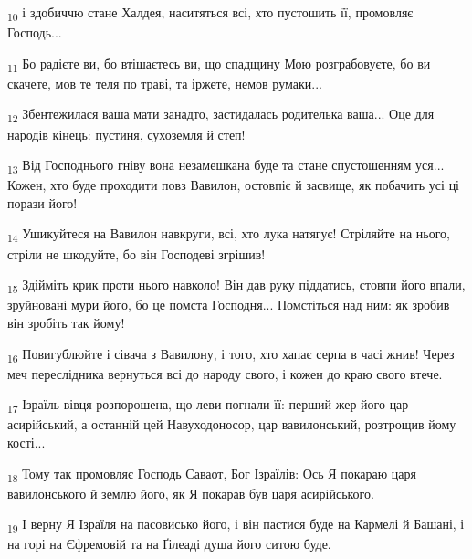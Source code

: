 \begin{tcolorbox}
\textsubscript{10} і здобиччю стане Халдея, наситяться всі, хто пустошить її, промовляє Господь...
\end{tcolorbox}
\begin{tcolorbox}
\textsubscript{11} Бо радієте ви, бо втішаєтесь ви, що спадщину Мою розграбовуєте, бо ви скачете, мов те теля по траві, та іржете, немов румаки...
\end{tcolorbox}
\begin{tcolorbox}
\textsubscript{12} Збентежилася ваша мати занадто, застидалась родителька ваша... Оце для народів кінець: пустиня, сухоземля й степ!
\end{tcolorbox}
\begin{tcolorbox}
\textsubscript{13} Від Господнього гніву вона незамешкана буде та стане спустошенням уся... Кожен, хто буде проходити повз Вавилон, остовпіє й засвище, як побачить усі ці порази його!
\end{tcolorbox}
\begin{tcolorbox}
\textsubscript{14} Ушикуйтеся на Вавилон навкруги, всі, хто лука натягує! Стріляйте на нього, стріли не шкодуйте, бо він Господеві згрішив!
\end{tcolorbox}
\begin{tcolorbox}
\textsubscript{15} Здійміть крик проти нього навколо! Він дав руку піддатись, стовпи його впали, зруйновані мури його, бо це помста Господня... Помстіться над ним: як зробив він зробіть так йому!
\end{tcolorbox}
\begin{tcolorbox}
\textsubscript{16} Повигублюйте і сівача з Вавилону, і того, хто хапає серпа в часі жнив! Через меч переслідника вернуться всі до народу свого, і кожен до краю свого втече.
\end{tcolorbox}
\begin{tcolorbox}
\textsubscript{17} Ізраїль вівця розпорошена, що леви погнали її: перший жер його цар асирійський, а останній цей Навуходоносор, цар вавилонський, розтрощив йому кості...
\end{tcolorbox}
\begin{tcolorbox}
\textsubscript{18} Тому так промовляє Господь Саваот, Бог Ізраїлів: Ось Я покараю царя вавилонського й землю його, як Я покарав був царя асирійського.
\end{tcolorbox}
\begin{tcolorbox}
\textsubscript{19} І верну Я Ізраїля на пасовисько його, і він пастися буде на Кармелі й Башані, і на горі на Єфремовій та на Ґілеаді душа його ситою буде.
\end{tcolorbox}
